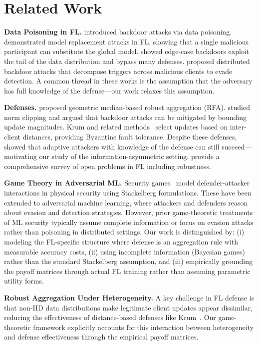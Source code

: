 \documentclass{article}
\begin{document}
\section{Related Work}
\label{sec:related}

\textbf{Data Poisoning in FL.} \citet{chen2017targeted} introduced backdoor attacks via data poisoning. \citet{bagdasaryan2020backdoor} demonstrated model replacement attacks in FL, showing that a single malicious participant can substitute the global model. \citet{wang2020attack} showed edge-case backdoors exploit the tail of the data distribution and bypass many defenses. \citet{xie2019dba} proposed distributed backdoor attacks that decompose triggers across malicious clients to evade detection. A common thread in these works is the assumption that the adversary has full knowledge of the defense---our work relaxes this assumption.

\textbf{Defenses.} \citet{pillutla2019robust} proposed geometric median-based robust aggregation (RFA). \citet{sun2019can} studied norm clipping and argued that backdoor attacks can be mitigated by bounding update magnitudes. Krum and related methods~\citep{blanchard2017machine} select updates based on inter-client distances, providing Byzantine fault tolerance. Despite these defenses, \citet{bhagoji2019analyzing} showed that adaptive attackers with knowledge of the defense can still succeed---motivating our study of the information-asymmetric setting. \citet{kairouz2019advances} provide a comprehensive survey of open problems in FL including robustness.

\textbf{Game Theory in Adversarial ML.} Security games~\citep{tambe2011security} model defender-attacker interactions in physical security using Stackelberg formulations. These have been extended to adversarial machine learning, where attackers and defenders reason about evasion and detection strategies. However, prior game-theoretic treatments of ML security typically assume complete information or focus on evasion attacks rather than poisoning in distributed settings. Our work is distinguished by: (i) modeling the FL-specific structure where defense is an aggregation rule with measurable accuracy costs, (ii) using incomplete information (Bayesian games) rather than the standard Stackelberg assumption, and (iii) empirically grounding the payoff matrices through actual FL training rather than assuming parametric utility forms.

\textbf{Robust Aggregation Under Heterogeneity.} A key challenge in FL defense is that non-IID data distributions make legitimate client updates appear dissimilar, reducing the effectiveness of distance-based defenses like Krum~\citep{kairouz2019advances}. Our game-theoretic framework explicitly accounts for this interaction between heterogeneity and defense effectiveness through the empirical payoff matrices.
\end{document}
